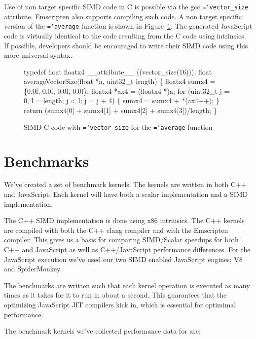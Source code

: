 \documentclass[preprint]{sigplanconf}
\newcommand{\ttt}[1]{{\texttt{\hyphenchar\font=`\-\relax #1}}}%
\begin{document}
Use of non target specific SIMD code in C is possible via the gcc
\ttt{vector\_size} attribute.  Emscripten also supports compiling such code.  A
non target specific version of the \ttt{average} function is shown in
Figure~\ref{fig:average-vector}.  The generated JavaScript code is virtually
identical to the code resulting from the C code using intrinsics. If
possible, developers should be encouraged to write their SIMD code using
this more universal syntax.

\begin{figure}
\begin{small}
\begin{program}[style=tt, number=true]
typedef float floatx4 \_\_attribute\_\_ ((vector\_size(16)));
fl\tab{}oat averageVectorSize(float *a, uint32\_t length) \{
  floatx4 sumx4 = \{0.0f, 0.0f, 0.0f, 0.0f\};
  floatx4 *ax4  = (floatx4 *)a;
  fo\tab{}r (uint32\_t j = 0, l = length; j < l; j = j + 4) \{
    sumx4 = sumx4 + *(ax4++);\untab{}
  \}
  return (\tab{}sumx4[0] + sumx4[1] +
          sumx4[2] + sumx4[3])/length;\untab{}\untab{}
\}
\end{program}
\end{small}
\caption{SIMD C code with \ttt{vector\_size} for the \ttt{average} function}
\label{fig:average-vector}
\end{figure}

\section{Benchmarks}

We've created a set of benchmark kernels.  The kernels are written in
both C++ and JavaScript.  Each kernel will have both a scalar implementation
and a SIMD implementation.

The C++ SIMD implementation is done using x86 intrinsics.  The C++ kernels are 
compiled with both the C++ clang compiler and with the Emscripten compiler.  
This gives us a basis for comparing SIMD/Scalar speedups for both C++ and
JavaScript as well as C++/JavaScript performance differences.  For the JavaScript
execution we've used our two SIMD enabled JavaScript engines; V8 and SpiderMonkey.

The benchmarks are written such that each kernel operation is executed as many times
as it takes for it to run in about a second.  This guarantees that the optimizing
JavaScript JIT compilers kick in, which is essential for optimimal performance.

The benchmark kernels we've collected performance data for are:
\end{document}
